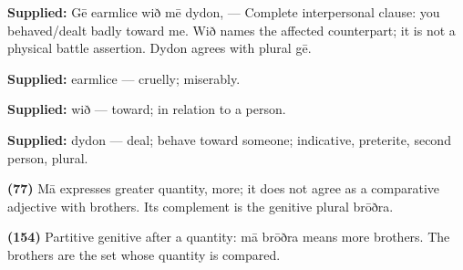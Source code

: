 \textbf{Supplied:} Gē earmlice wið mē dydon, — Complete interpersonal clause: you behaved/\allowbreak{}dealt badly toward me. Wið names the affected counterpart; it is not a physical battle assertion. Dydon agrees with plural gē.

\textbf{Supplied:} earmlice — cruelly; miserably.

\textbf{Supplied:} wið — toward; in relation to a person.

\textbf{Supplied:} dydon — deal; behave toward someone; indicative, preterite, second person, plural.

\textbf{(77)} Mā expresses greater quantity, more; it does not agree as a comparative adjective with brothers. Its complement is the genitive plural brōðra.

\textbf{(154)} Partitive genitive after a quantity: mā brōðra means more brothers. The brothers are the set whose quantity is compared.

